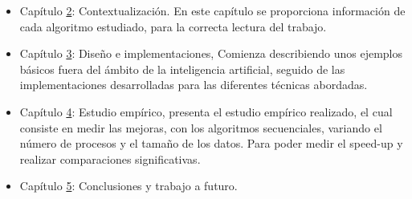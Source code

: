 \begin{itemize}
	\item Capítulo \hyperref[cap:c2_context]{2}: Contextualización. En este capítulo se proporciona información de cada algoritmo estudiado, para la correcta lectura del trabajo.
	\item Capítulo \hyperref[cap:c3_implementaciones]{3}: Diseño e implementaciones, Comienza describiendo unos ejemplos básicos fuera del ámbito de la inteligencia artificial, seguido de las implementaciones desarrolladas para las diferentes técnicas abordadas.
	\item Capítulo \hyperref[cap:c4_estudio]{4}: Estudio empírico, presenta el estudio empírico realizado, el cual consiste en medir las mejoras, con los algoritmos secuenciales, variando el número de procesos y el tamaño de los datos. Para poder medir el speed-up y realizar comparaciones significativas.
	\item Capítulo \hyperref[cap:c5_conclu]{5}: Conclusiones y trabajo a futuro.
\end{itemize}
















